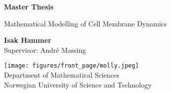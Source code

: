 \documentclass[12pt]{article}
\begin{document}
\begin{titlepage}
    \begin{center}
        \vspace*{1cm}

        \Huge
        \textbf{Master Thesis}

        \vspace{0.5cm}
        \Large
        Mathematical Modelling of Cell Membrane Dynamics  \\

        \vspace{1.5cm}

        \textbf{Isak Hammer} \\
        \vspace{0.5cm}
        Supervisor: André Massing


        \vfill


        \vspace{0.8cm}

        \texttt{[image: figures/front\_page/molly.jpeg]}\\

        \Large
        Department of Mathematical Sciences\\
        Norwegian University of Science and Technology\\

    \end{center}

\end{titlepage}

    \newpage
    \label{sec:eyyy}


    
    
    
    
    

    \newpage
    \printbibliography
\end{document}
